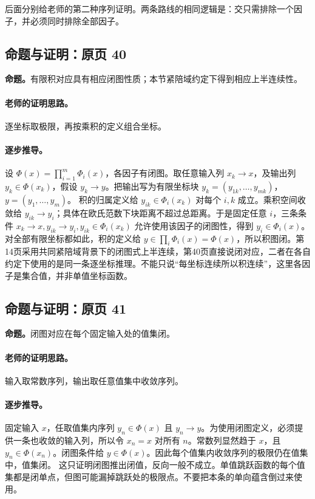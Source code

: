 后面分别给老师的第二种序列证明。两条路线的相同逻辑是：交只需排除一个因子，并必须同时排除全部因子。


\subsection{命题与证明：原页 40}

\textbf{命题。}有限积对应具有相应闭图性质；本节紧陪域约定下得到相应上半连续性。

\paragraph{老师的证明思路。}逐坐标取极限，再按乘积的定义组合坐标。

\paragraph{逐步推导。}
设 $\Phi(x)=\prod_{i=1}^m\Phi_i(x)$，各因子有闭图。取任意输入列 $x_k\to x$，及输出列 $y_k\in\Phi(x_k)$，假设 $y_k\to y$。把输出写为有限坐标块 $y_k=(y_{1k},\ldots,y_{mk})$，$y=(y_1,\ldots,y_m)$。
积的归属定义给 $y_{ik}\in\Phi_i(x_k)$ 对每个 $i,k$ 成立。乘积空间收敛给 $y_{ik}\to y_i$；具体在欧氏范数下块距离不超过总距离。于是固定任意 $i$，三条条件 $x_k\to x,y_{ik}\to y_i,y_{ik}\in\Phi_i(x_k)$ 允许使用该因子的闭图性，得到 $y_i\in\Phi_i(x)$。
对全部有限坐标都如此，积的定义给 $y\in\prod_i\Phi_i(x)=\Phi(x)$，所以积图闭。第14页采用共同紧陪域背景下的闭图式上半连续，第40页直接说闭对应，二者在各自约定下使用的是同一条逐坐标推理。不能只说“每坐标连续所以积连续”，这里各因子是集合值，并非单值坐标函数。


\subsection{命题与证明：原页 41}

\textbf{命题。}闭图对应在每个固定输入处的值集闭。

\paragraph{老师的证明思路。}输入取常数序列，输出取任意值集中收敛序列。

\paragraph{逐步推导。}
固定输入 $x$，任取值集内序列 $y_n\in\Phi(x)$ 且 $y_n\to y$。为使用闭图定义，必须提供一条也收敛的输入列，所以令 $x_n=x$ 对所有 $n$。常数列显然趋于 $x$，且 $y_n\in\Phi(x_n)$。闭图条件给 $y\in\Phi(x)$。因此每个值集内收敛序列的极限仍在值集中，值集闭。
这只证明闭图推出闭值，反向一般不成立。单值跳跃函数的每个值集都是闭单点，但图可能漏掉跳跃处的极限点。不要把本条的单向蕴含倒过来使用。


